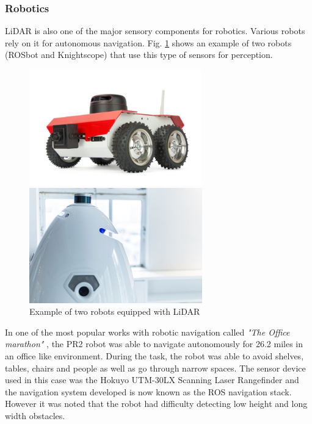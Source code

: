 \subsubsection{Robotics}
\ac{LiDAR} is also one of the major sensory components for robotics. Various robots rely on it for autonomous navigation. Fig. \ref{fig:robotslidar} shows an example of two robots (ROSbot and Knightscope) that use this type of sensors for perception.
\begin{figure}[ht] 
    \begin{minipage}[b]{.49\linewidth}
        \includegraphics[height=5cm,width=\linewidth]{imgs/chapter2/robot1.jpg}
    \end{minipage}
    \begin{minipage}[b]{.49\linewidth}
        \includegraphics[height=5cm,width=\linewidth]{imgs/chapter2/robot2.jpg}
    \end{minipage}
    \caption{Example of two robots equipped with \ac{LiDAR}}
    \label{fig:robotslidar}
\end{figure}


In one of the most popular works with robotic navigation called \textit{"The Office marathon"}  \cite{marder2010office},  the PR2 robot was able to navigate autonomously for 26.2 miles in an office like environment. During the task, the robot was able to avoid  shelves, tables, chairs and people as well as go
through narrow spaces. The sensor device used in this case was the Hokuyo UTM-30LX Scanning Laser Rangefinder and the navigation system developed is now known as the \ac{ROS} navigation stack. However it was noted that the robot had difficulty detecting low height and long width obstacles.


